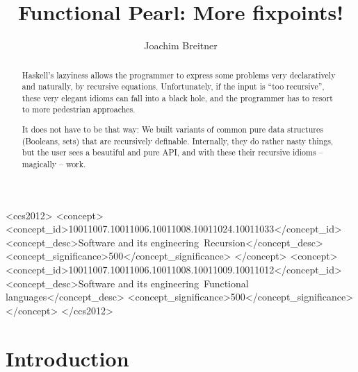 \documentclass[manuscript,screen,acmsmall]{acmart}
\begin{document}
\title{Functional Pearl: More fixpoints!}

\author{Joachim Breitner}


\begin{abstract}
Haskell’s lazyiness allows the programmer to express some problems very declaratively and naturally, by recursive equations. Unfortunately, if the input is “too recursive”, these very elegant idioms can fall into a black hole, and the programmer has to resort to more pedestrian approaches.

It does not have to be that way: We built variants of common pure data structures (Booleans, sets) that are recursively definable. Internally, they do rather nasty things, but the user sees a beautiful and pure API, and with these their recursive idioms -- magically -- work.

\end{abstract}

\begin{CCSXML}
<ccs2012>
   <concept>
       <concept_id>10011007.10011006.10011008.10011024.10011033</concept_id>
       <concept_desc>Software and its engineering~Recursion</concept_desc>
       <concept_significance>500</concept_significance>
       </concept>
   <concept>
       <concept_id>10011007.10011006.10011008.10011009.10011012</concept_id>
       <concept_desc>Software and its engineering~Functional languages</concept_desc>
       <concept_significance>500</concept_significance>
       </concept>
 </ccs2012>
\end{CCSXML}



\maketitle

\section{Introduction}
\end{document}
